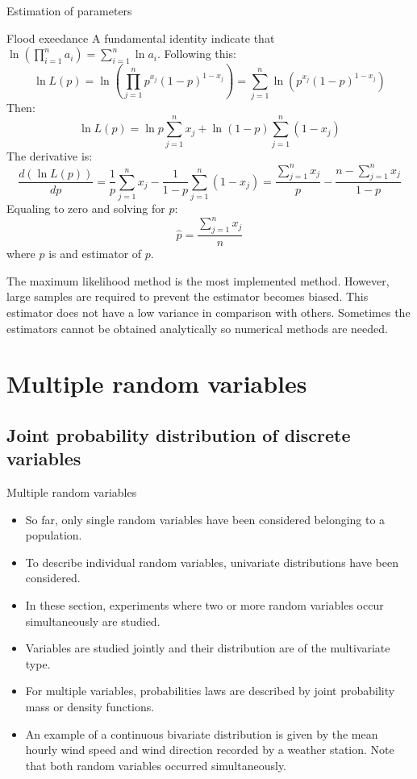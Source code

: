 \documentclass[8pt]{beamer}
\renewcommand{\emph}[1]{\textcolor{myorange}{#1}}
\begin{document}
\begin{frame}{Estimation of parameters}
    \begin{exampleblock}{Flood exeedance}
        A fundamental identity indicate that $\ln \left( \prod_{i=1}^n a_i \right) = \sum_{i=1}^n \ln a_i$. Following this:
        \[
            \ln L (p) = \ln \left( \prod_{j=1}^n p^{x_j} (1-p)^{1-x_j} \right) = \sum_{j=1}^n \ln \left( p^{x_j} (1-p)^{1-x_j} \right) 
        \]
        Then:
        \[
            \ln L (p) = \ln p \sum_{j=1}^n x_j  +  \ln (1-p)\sum_{j=1}^n (1-x_j)
        \]
        The derivative is:
        \[
            \frac{d \left( \ln L (p) \right)}{dp} = \frac{1}{p} \sum_{j=1}^n x_j - \frac{1}{1-p}\sum_{j=1}^n (1-x_j) = \frac{\sum_{j=1}^n x_j}{p} - \frac{n - \sum_{j=1}^n x_j}{1-p}
        \]
        Equaling to zero and solving for $p$:
        \[
            \hat{p} = \frac{\sum_{j=1}^n x_j}{n}
        \]
        where $\hat{p}$ is and estimator of $p$. 
    \end{exampleblock}
    The \emph{maximum likelihood method} is the most implemented method. However, large samples are required to prevent the estimator becomes biased. This estimator does not have a low variance in comparison with others. Sometimes the estimators cannot be obtained analytically so numerical methods are needed.
\end{frame}

\section{Multiple random variables} %

\subsection{Joint probability distribution of discrete variables} %
\begin{frame}{Multiple random variables}
    \begin{itemize}
        \item So far, only \emph{single random variables} have been considered belonging to a population.  
        \item To describe individual random variables, \emph{univariate distributions} have been considered.
        \item In these section, experiments where two or more random variables occur simultaneously are studied. 
        \item Variables are studied jointly and their distribution are of the multivariate type.
        \item For \emph{multiple variables}, probabilities laws are described by \emph{joint probability mass or density functions}.
        \item An example of a continuous bivariate distribution is given by the mean hourly wind speed and wind direction recorded by a weather station. Note that both random variables occurred simultaneously. 
    \end{itemize}
\end{frame}
\end{document}
